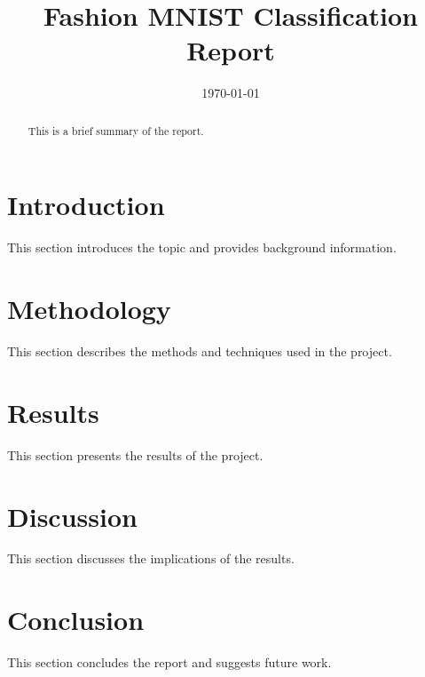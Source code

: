 \documentclass{article}
\title{Fashion MNIST Classification Report}
\author{}
\date{\today}
\begin{document}
\maketitle

\begin{abstract}
This is a brief summary of the report.
\end{abstract}

\section{Introduction}
This section introduces the topic and provides background information.

\section{Methodology}
This section describes the methods and techniques used in the project.

\section{Results}
This section presents the results of the project.

\section{Discussion}
This section discusses the implications of the results.

\section{Conclusion}
This section concludes the report and suggests future work.
\end{document}
